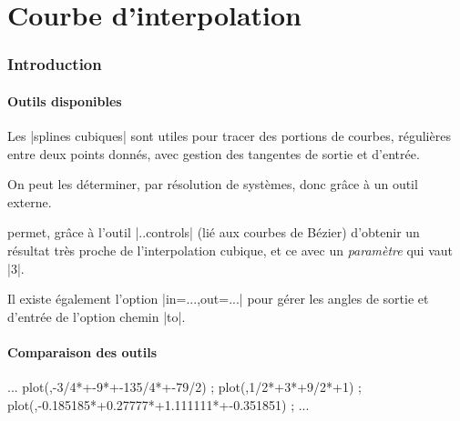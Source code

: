 \documentclass{article}
\begin{document}
\newcommand\listecoeffs[4]{%
	\draw (0,5.5) node[left,Aquamarine,font=\small\ttfamily] {Coeffs} ;
	\node[coeffs] at (2,5.5) {#1} ;
	\node[coeffs] at ({(4+7.5)/2},5.5) {#2} ;
	\node[coeffs] at ({(7.5+9)/2},5.5) {#3} ;
	\node[coeffs] at ({(9+10)/2},5.5) {#4} ;%
}

\part*{Courbe d'interpolation}

\section{Introduction}

\subsection{Outils disponibles}

Les \rverb|splines cubiques| sont utiles pour \og tracer \fg{} des portions de courbes, régulières entre deux points donnés, avec gestion des tangentes de sortie et d'entrée.

On peut les déterminer, par résolution de systèmes, donc grâce à un outil externe.

\smallskip

\TikZ{} permet, grâce à l'outil \overb|..controls| (lié aux courbes de Bézier) d'obtenir un résultat très proche de l'interpolation cubique, et ce avec un \textit{paramètre} qui vaut \overb|3|.

\smallskip

Il existe également l'option \vverb|in=...,out=...| pour gérer les angles de sortie et d'entrée de l'option chemin \vverb|to|.


\subsection{Comparaison des outils}

{\scriptsize \begin{codehigh}[language=latex/latex2,style/main=red!25,style/code=red!25]
...
\draw[courbe,domain=-5:-3] plot(\x,{-3/4*\x*\x*\x+-9*\x*\x+-135/4*\x+-79/2}) ;
\draw[courbe,domain=-3:-1] plot(\x,{1/2*\x*\x*\x+3*\x*\x+9/2*\x+1}) ;
\draw[courbe,domain=-1:2] plot(\x,{-0.185185*\x*\x*\x+0.27777*\x*\x+1.111111*\x+-0.351851}) ;
...
\end{codehigh}}
\end{document}
